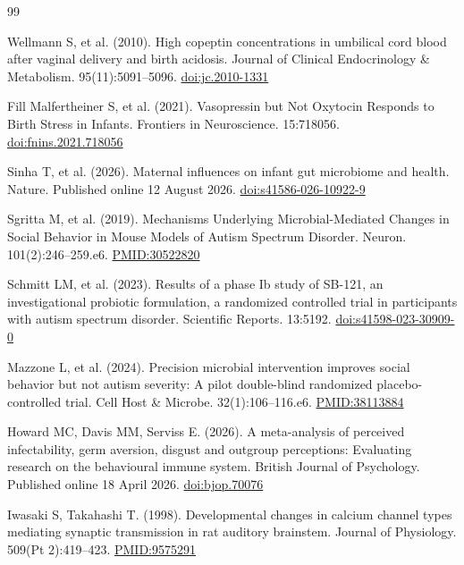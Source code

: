 \begin{thebibliography}{99}

\small

 Wellmann S, et al. (2010). High copeptin concentrations in umbilical cord blood after vaginal delivery and birth acidosis. Journal of Clinical Endocrinology \& Metabolism. 95(11):5091–5096. \href{https://doi.org/10.1210/jc.2010-1331}{doi:jc.2010-1331}

 Fill Malfertheiner S, et al. (2021). Vasopressin but Not Oxytocin Responds to Birth Stress in Infants. Frontiers in Neuroscience. 15:718056. \href{https://doi.org/10.3389/fnins.2021.718056}{doi:fnins.2021.718056}

 Sinha T, et al. (2026). Maternal influences on infant gut microbiome and health. Nature. Published online 12 August 2026. \href{https://doi.org/10.1038/s41586-026-10922-9}{doi:s41586-026-10922-9}

 Sgritta M, et al. (2019). Mechanisms Underlying Microbial-Mediated Changes in Social Behavior in Mouse Models of Autism Spectrum Disorder. Neuron. 101(2):246–259.e6. \href{https://pubmed.ncbi.nlm.nih.gov/30522820/}{PMID:30522820}

 Schmitt LM, et al. (2023). Results of a phase Ib study of SB-121, an investigational probiotic formulation, a randomized controlled trial in participants with autism spectrum disorder. Scientific Reports. 13:5192. \href{https://doi.org/10.1038/s41598-023-30909-0}{doi:s41598-023-30909-0}

 Mazzone L, et al. (2024). Precision microbial intervention improves social behavior but not autism severity: A pilot double-blind randomized placebo-controlled trial. Cell Host \& Microbe. 32(1):106–116.e6. \href{https://pubmed.ncbi.nlm.nih.gov/38113884/}{PMID:38113884}

 Howard MC, Davis MM, Serviss E. (2026). A meta-analysis of perceived infectability, germ aversion, disgust and outgroup perceptions: Evaluating research on the behavioural immune system. British Journal of Psychology. Published online 18 April 2026. \href{https://doi.org/10.1111/bjop.70076}{doi:bjop.70076}

 Iwasaki S, Takahashi T. (1998). Developmental changes in calcium channel types mediating synaptic transmission in rat auditory brainstem. Journal of Physiology. 509(Pt 2):419–423. \href{https://pubmed.ncbi.nlm.nih.gov/9575291/}{PMID:9575291}


\end{thebibliography}

